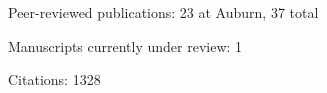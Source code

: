 \begin{veryTightItemize}
    \item Peer-reviewed publications: 23 at Auburn, 37 total
    \item Manuscripts currently under review: 1
    \item Citations: 1328
\end{veryTightItemize}
